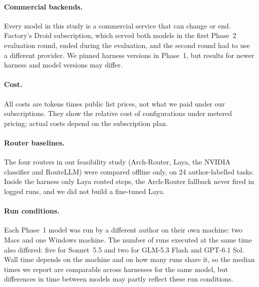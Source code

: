 \paragraph{Commercial backends.}
Every model in this study is a commercial service that can change or end. Factory's Droid
subscription, which served both models in the first Phase~2 evaluation round, ended during the evaluation, and
the second round had to use a different provider. We pinned harness versions in Phase~1, but results for newer
harness and model versions may differ.

\paragraph{Cost.}
All costs are tokens times public list prices, not what we paid under our subscriptions. They show the relative
cost of configurations under metered pricing; actual costs depend on the subscription plan.

\paragraph{Router baselines.}
The four routers in our feasibility study (Arch-Router, Laya, the NVIDIA classifier and RouteLLM) were compared
offline only, on 24 author-labelled tasks. Inside the harness only Laya routed steps, the Arch-Router fallback
never fired in logged runs, and we did not build a fine-tuned Laya.

\paragraph{Run conditions.}
Each Phase~1 model was run by a different author on their own machine: two Macs and one Windows machine. The
number of runs executed at the same time also differed: five for Sonnet~5.5 and two for GLM-5.3 Flash and
GPT-6.1 Sol. Wall time depends on the machine and on how many runs share it, so the median times we report are
comparable across harnesses for the same model, but differences in time between models may partly reflect these
run conditions.
